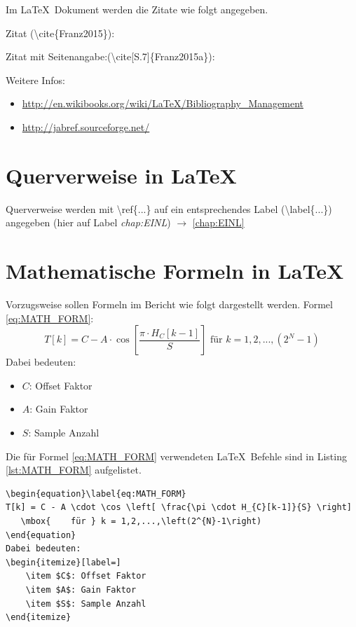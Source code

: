 \documentclass[TGAI_Laborbericht.tex]{subfiles}
\begin{document}
Im \LaTeX ~Dokument werden die Zitate wie folgt angegeben.

\raggedright Zitat (\textbackslash cite\{Franz2015\}): \linebreak
\cite{Franz2015}


\raggedright Zitat mit Seitenangabe:(\textbackslash cite[S.7]\{Franz2015a\}): \linebreak
\cite[S.7]{Franz2015a}\\
\raggedright Weitere Infos:
\begin{itemize}
	\item \href{http://en.wikibooks.org/wiki/LaTeX/Bibliography\_Management}{http://en.wikibooks.org/wiki/LaTeX/Bibliography\_Management}
	\item \href{http://jabref.sourceforge.net/}{http://jabref.sourceforge.net/}
\end{itemize}

\section{Querverweise in \LaTeX}
\raggedright Querverweise werden mit \textbackslash ref\{...\} auf ein entsprechendes Label (\textbackslash label\{...\}) angegeben (hier auf Label \textit{chap:EINL}) \linebreak
$\longrightarrow$ \ref{chap:EINL}


\section{Mathematische Formeln in \LaTeX}
Vorzugsweise sollen Formeln im Bericht wie folgt dargestellt werden.\linebreak
Formel \ref{eq:MATH_FORM}:
\begin{equation}\label{eq:MATH_FORM}
T[k]=C-A\cdot\cos\left[\frac{\pi \cdot H_{C}[k-1]}{S}\right]   \mbox{    für } k = 1,2,...,\left(2^{N}-1\right)
\end{equation}
Dabei bedeuten:
\begin{itemize}[label=]
    \item $C$: Offset Faktor
    \item $A$: Gain Faktor
    \item $S$: Sample Anzahl
\end{itemize}
Die für Formel \ref{eq:MATH_FORM} verwendeten \LaTeX ~Befehle sind in Listing \ref{lst:MATH_FORM} aufgelistet.
\begin{lstlisting}[style=LATEX, frame=single, caption=Latex Befehle für Formel \ref{eq:MATH_FORM}, captionpos=b, label=lst:MATH_FORM_LST]
\begin{equation}\label{eq:MATH_FORM}
T[k] = C - A \cdot \cos \left[ \frac{\pi \cdot H_{C}[k-1]}{S} \right]
   \mbox{    für } k = 1,2,...,\left(2^{N}-1\right)
\end{equation}
Dabei bedeuten:
\begin{itemize}[label=]
    \item $C$: Offset Faktor
    \item $A$: Gain Faktor
    \item $S$: Sample Anzahl
\end{itemize}
\end{lstlisting}
\end{document}
